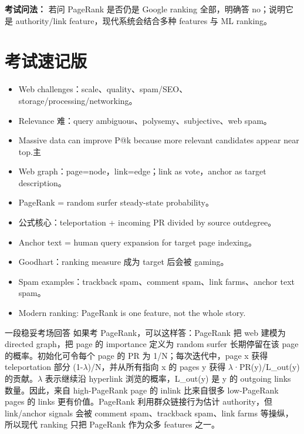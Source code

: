 \documentclass[11pt,a4paper]{ctexart}
\begin{document}
\noindent\textbf{考试问法：} 若问 PageRank 是否仍是 Google ranking 全部，明确答 no；说明它是 authority/link feature，现代系统会结合多种 features 与 ML ranking。

\section{考试速记版}
\begin{itemize}
\item Web challenges：scale、quality、spam/SEO、storage/processing/networking。
\item Relevance 难：query ambiguous、polysemy、subjective、web spam。
\item Massive data can improve P@k because more relevant candidates appear near top.主
\item Web graph：page=node，link=edge；link as vote，anchor as target description。
\item PageRank = random surfer steady-state probability。
\item 公式核心：teleportation + incoming PR divided by source outdegree。
\item Anchor text = human query expansion for target page indexing。
\item Goodhart：ranking measure 成为 target 后会被 gaming。
\item Spam examples：trackback spam、comment spam、link farms、anchor text spam。
\item Modern ranking: PageRank is one feature, not the whole story.
\end{itemize}
\begin{callout}{一段稳妥考场回答}
如果考 PageRank，可以这样答：PageRank 把 web 建模为 directed graph，把 page 的 importance 定义为 random surfer 长期停留在该 page 的概率。初始化可令每个 page 的 PR 为 1/N；每次迭代中，page x 获得 teleportation 部分 (1-\(\lambda\))/N，并从所有指向 x 的 pages y 获得 \(\lambda\)·PR(y)/L\_out(y) 的贡献。\(\lambda\) 表示继续沿 hyperlink 浏览的概率，L\_out(y) 是 y 的 outgoing links 数量。因此，来自 high-PageRank page 的 inlink 比来自很多 low-PageRank pages 的 links 更有价值。PageRank 利用群众链接行为估计 authority，但 link/anchor signals 会被 comment spam、trackback spam、link farms 等操纵，所以现代 ranking 只把 PageRank 作为众多 features 之一。
\end{callout}
\end{document}
